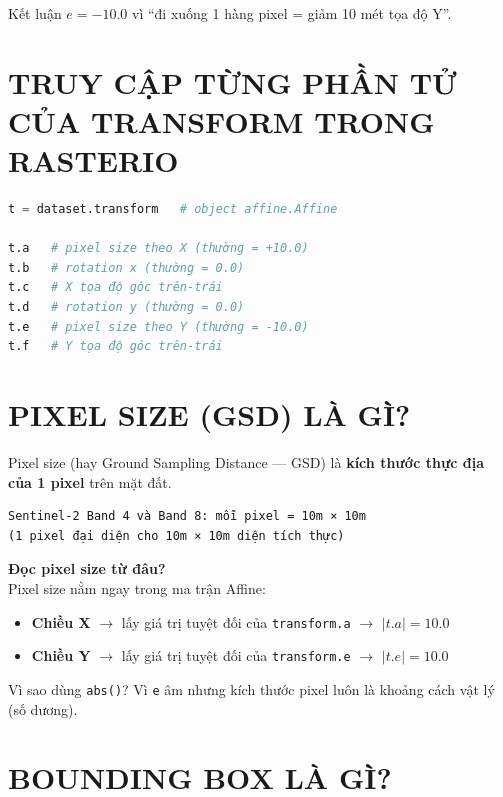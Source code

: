 \documentclass[12pt,a4paper]{report}
\begin{document}
\begin{insightbox}{Kết luận}
$e = -10.0$ vì ``đi xuống 1 hàng pixel = giảm 10 mét tọa độ Y''.
\end{insightbox}

\section{TRUY CẬP TỪNG PHẦN TỬ CỦA TRANSFORM TRONG RASTERIO}

\begin{lstlisting}[language=python]
t = dataset.transform   # object affine.Affine

t.a   # pixel size theo X (thường = +10.0)
t.b   # rotation x (thường = 0.0)
t.c   # X tọa độ góc trên-trái
t.d   # rotation y (thường = 0.0)
t.e   # pixel size theo Y (thường = -10.0)
t.f   # Y tọa độ góc trên-trái
\end{lstlisting}

\section{PIXEL SIZE (GSD) LÀ GÌ?}

Pixel size (hay Ground Sampling Distance — GSD) là \textbf{kích thước thực địa của 1 pixel} trên mặt đất.

\begin{verbatim}
Sentinel-2 Band 4 và Band 8: mỗi pixel = 10m × 10m
(1 pixel đại diện cho 10m × 10m diện tích thực)
\end{verbatim}

\textbf{Đọc pixel size từ đâu?} \\
Pixel size nằm ngay trong ma trận Affine:
\begin{itemize}
    \item \textbf{Chiều X} $\rightarrow$ lấy giá trị tuyệt đối của \texttt{transform.a} $\rightarrow$ $|t.a| = 10.0$
    \item \textbf{Chiều Y} $\rightarrow$ lấy giá trị tuyệt đối của \texttt{transform.e} $\rightarrow$ $|t.e| = 10.0$
\end{itemize}

\begin{insightbox}{Vì sao dùng \texttt{abs()}?}
Vì \texttt{e} âm nhưng kích thước pixel luôn là khoảng cách vật lý (số dương).
\end{insightbox}

\section{BOUNDING BOX LÀ GÌ?}
\end{document}
